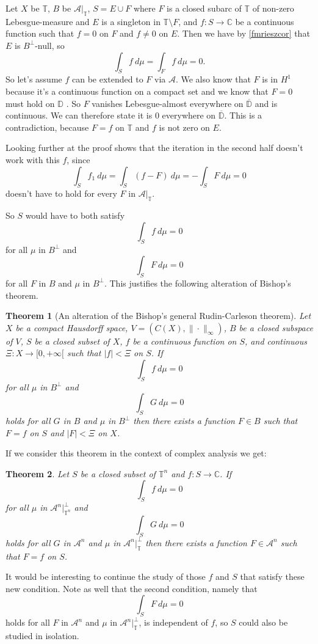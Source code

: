 \documentclass[a4paper,12pt,twoside,BCOR=10mm]{scrbook}
\newtheorem{theorem}{Theorem}[section]
\theoremstyle{definition}
\theoremstyle{definition}
\theoremstyle{definition}
\begin{document}
Let
	$X$ be $\mathbb{T}$,
	$B$ be $\mathcal{A}|_{\mathbb{T}}$,
	$S = E \cup F$ where $F$ is a closed subarc of $\mathbb{T}$ of non-zero Lebesgue-measure and $E$ is a singleton in $\mathbb{T} \setminus F$,
	and $f: S \rightarrow \mathbb{C}$ be a continuous function such that $f = 0$ on $F$ and $f \neq 0$ on $E$.
Then we have by \ref{fmrieszcor} that $E$ is $B^{\bot}$-null, so
\[
	\int_S f\ d\mu = \int_F f\ d\mu = 0.
\]
So let's assume $f$ can be extended to $F$ via $\mathcal{A}$.
We also know that $F$ is in $H^1$ because it's a continuous function on a compact set and we know that $F = 0$ must hold on $\mathbb{D}$
\citep[Theorem $13.4.11$]{greenkrantz}.
So $F$ vanishes Lebesgue-almost everywhere on $\overline{\mathbb{D}}$ and is continuous.
We can therefore state it is $0$ everywhere on $\overline{\mathbb{D}}$.
This is a contradiction, because $F = f$ on $\mathbb{T}$ and $f$ is not zero on $E$.

Looking further at the proof shows that the iteration in the second half doesn't work with this $f$, since 
\[
	\int_S f_1\ d\mu = \int_S (f - F)\ d\mu = -\int_S F\ d\mu = 0
\]
doesn't have to hold for every $F$ in $\mathcal{A}|_{\mathbb{T}}$.

So $S$ would have to both satisfy
\[
	\int_S f\ d\mu = 0
\]
for all $\mu$ in $B^{\bot}$ and
\[
	\int_S F\ d\mu = 0
\]
for all $F$ in $B$ and $\mu$ in $B^{\bot}$.
This justifies the following alteration of Bishop's theorem.
\begin{theorem}[An alteration of the Bishop's general Rudin-Carleson theorem]
Let $X$ be a compact Hausdorff space,
	$V = (C(X), \| \cdot \|_{\infty})$,
	$B$ be a closed subspace of $V$,
	$S$ be a closed subset of $X$,
	$f$ be a continuous function on $S$,
	and continuous $\Xi: X \rightarrow [0, +\infty[$ such that $|f| < \Xi$ on $S$.
If
\[
	\int_S f\ d\mu = 0
\]
for all $\mu$ in $B^{\bot}$ and
\[
	\int_S G\ d\mu = 0
\]
holds for all $G$ in $B$ and $\mu$ in $B^{\bot}$ then there exists a function $F \in B$ such that $F = f$ on $S$ and $|F| < \Xi$ on $X$.
\end{theorem}
If we consider this theorem in the context of complex analysis we get:
\begin{theorem}
Let $S$ be a closed subset of $\mathbb{T}^n$ and $f: S \rightarrow \mathbb{C}$.
If
\[
	\int_S f\ d\mu = 0
\]
for all $\mu$ in $\mathcal{A}^n|_{\mathbb{T}^n}^{\bot}$ and
\[
	\int_S G\ d\mu = 0
\]
holds for all $G$ in $\mathcal{A}^n$ and $\mu$ in $\mathcal{A}^n|_{\mathbb{T}}^{\bot}$ then there exists a function $F \in \mathcal{A}^n$ such that $F = f$ on $S$.
\end{theorem}
It would be interesting to continue the study of those $f$ and $S$ that satisfy these new condition.
Note as well that the second condition, namely that
\[
	\int_S F\ d\mu = 0
\]
holds for all $F$ in $\mathcal{A}^n$ and $\mu$ in $\mathcal{A}^n|_{\mathbb{T}}^{\bot}$, is independent of $f$, so $S$ could also be studied in isolation.
\end{document}
